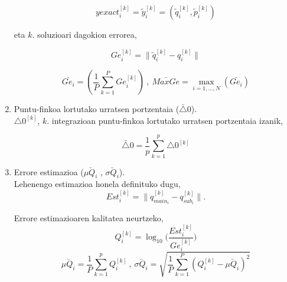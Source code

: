 \begin{enumerate}
            \begin{equation*}
            yexact^{[k]}_i=\tilde{y}^{[k]}_i=(\tilde{q}^{[k]}_i,\tilde{p}^{[k]}_i)
            \end{equation*}

            eta $k.$ soluzioari dagokion errorea, 
            
            \begin{equation*}
            Ge^{[k]}_i=\|\tilde{q}^{[k]}_i-q^{[k]}_i\|
            \end{equation*}
            
            \begin{equation*}
            \bar{Ge_i}= (\frac{1}{P}\sum_{k=1}^{P} Ge^{[k]}_i) \ , \
                          \bar{MaxGe}=\max_{i=1,\dots,N} (\bar{Ge_i})
            \end{equation*}           
           
            \item Puntu-finkoa lortutako urratsen portzentaia ($\bar{\triangle}0$).\\
           
            $\triangle0^{[k]}$,  $k.$ integrazioan puntu-finkoa lortutako urratsen portzentaia izanik,
            
            \begin{equation*}
            \bar{\triangle}0= \frac{1}{p}\sum_{k=1}^{p}\triangle0^{[k]}
            \end{equation*}
 
            \item Errore estimazioa ($\bar{\mu Q_i}$ , $\bar{\sigma Q_i}$). \\
            
            Lehenengo estimazioa honela definituko dugu,
            \begin{equation*}
            Est^{[k]}_i=\|{q}^{[k]}_{main_i}-q^{[k]}_{sub_i}\|.
            \end{equation*}

            
            Errore estimazioaren kalitatea neurtzeko,
            \begin{equation} \label{eq:eq_Qi}
               Q_i^{[k]}=\log_{10} \bigg(\frac{Est^{[k]}_i}{Ge^{[k]}_i}\bigg)
            \end{equation}
            \[\bar{\mu Q_i}=\frac{1}{P}\sum_{k=1}^{p} Q_i^{[k]} \ , \ 
              \bar{\sigma Q_i}=\sqrt{\frac{1}{P}\sum_{k=1}^{P} (Q_i^{[k]}-\bar{\mu Q_i})^2}\]
\end{enumerate} 

